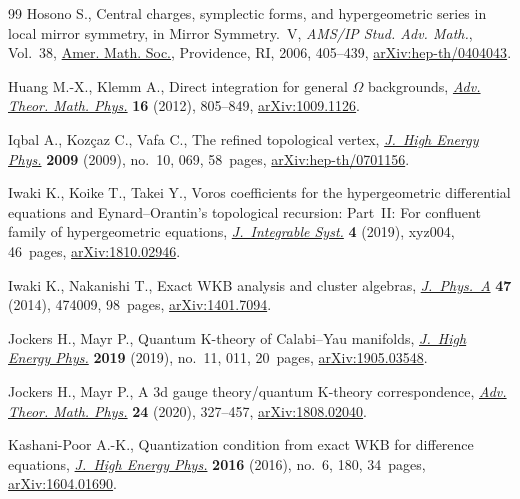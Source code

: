 \documentclass[pdftex]{sigma}
\numberwithin{equation}{section}
\begin{document}
\begin{thebibliography}{99}
Hosono S., Central charges, symplectic forms, and hypergeometric series in
 local mirror symmetry, in Mirror Symmetry.~{V}, \textit{AMS/IP Stud. Adv.
 Math.}, Vol.~38, \href{https://doi.org/10.1090/amsip/038/18}{Amer. Math. Soc.}, Providence, RI, 2006, 405--439,
 \href{https://arxiv.org/abs/hep-th/0404043}{arXiv:hep-th/0404043}.

Huang M.-X., Klemm A., Direct integration for general {$\Omega$} backgrounds,
 \href{https://dx.doi.org/10.4310/ATMP.2012.v16.n3.a2}{\textit{Adv. Theor. Math. Phys.}} \textbf{16} (2012), 805--849,
 \href{https://arxiv.org/abs/1009.1126}{arXiv:1009.1126}.

Iqbal A., Koz\c{c}az C., Vafa C., The refined topological vertex,
 \href{https://doi.org/10.1088/1126-6708/2009/10/069}{\textit{J.~High Energy Phys.}} \textbf{2009} (2009), no.~10, 069, 58~pages,
 \href{https://arxiv.org/abs/hep-th/0701156}{arXiv:hep-th/0701156}.

Iwaki K., Koike T., Takei Y., Voros coefficients for the hypergeometric
 differential equations and {E}ynard--{O}rantin's topological recursion:
 {P}art~{II}: {F}or confluent family of hypergeometric equations,
 \href{https://doi.org/10.1093/integr/xyz004}{\textit{J.~Integrable Syst.}} \textbf{4} (2019), xyz004, 46~pages,
 \href{https://arxiv.org/abs/1810.02946}{arXiv:1810.02946}.

Iwaki K., Nakanishi T., Exact {WKB} analysis and cluster algebras,
 \href{https://doi.org/10.1088/1751-8113/47/47/474009}{\textit{J.~Phys.~A}} \textbf{47} (2014), 474009, 98~pages, \href{https://arxiv.org/abs/1401.7094}{arXiv:1401.7094}.

Jockers H., Mayr P., Quantum {K}-theory of {C}alabi--{Y}au manifolds,
 \href{https://doi.org/10.1007/jhep11(2019)011}{\textit{J.~High Energy Phys.}} \textbf{2019} (2019), no.~11, 011, 20~pages,
 \href{https://arxiv.org/abs/1905.03548}{arXiv:1905.03548}.

Jockers H., Mayr P., A 3d gauge theory/quantum {K}-theory correspondence,
 \href{https://doi.org/10.4310/ATMP.2020.v24.n2.a4}{\textit{Adv. Theor. Math. Phys.}} \textbf{24} (2020), 327--457, \href{https://arxiv.org/abs/1808.02040}{arXiv:1808.02040}.

Kashani-Poor A.-K., Quantization condition from exact {WKB} for difference
 equations, \href{https://doi.org/10.1007/JHEP06(2016)180}{\textit{J.~High Energy Phys.}} \textbf{2016} (2016), no.~6, 180,
 34~pages, \href{https://arxiv.org/abs/1604.01690}{arXiv:1604.01690}.


\end{thebibliography}
\end{document}
